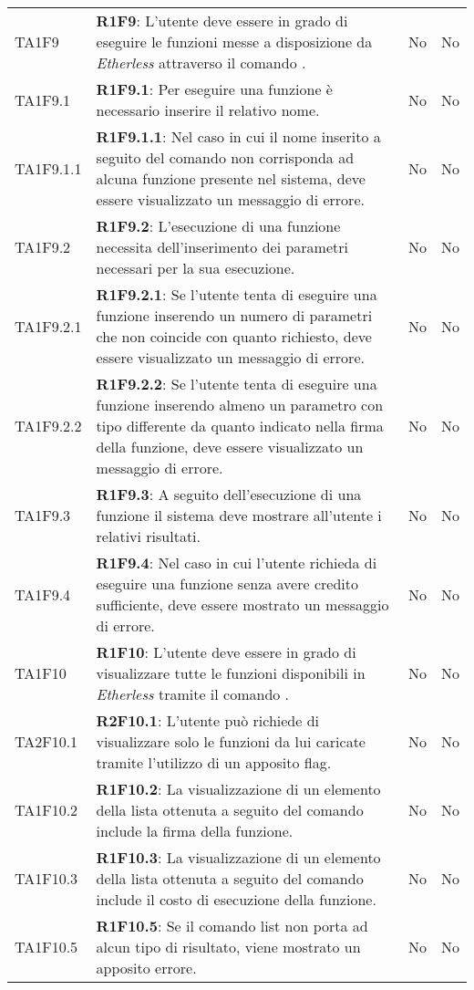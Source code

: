 \begin{longtable}{
		>{\centering}p{} 
		>{}p{}
		>{\centering}p{}
		>{\centering}p{} }
	TA1F9 		& \textbf{R1F9}: L'utente deve essere in grado di eseguire le funzioni messe a disposizione da \textit{Etherless} attraverso il comando \run{}.											& No & No \tabularnewline
	TA1F9.1 		& \textbf{R1F9.1}: Per eseguire una funzione è necessario inserire il relativo nome. 																										& No & No \tabularnewline
	TA1F9.1.1 	& \textbf{R1F9.1.1}: Nel caso in cui il nome inserito a seguito del comando \run{} non corrisponda ad alcuna funzione presente nel sistema, deve essere visualizzato un messaggio di errore. & No & No \tabularnewline
	TA1F9.2 		& \textbf{R1F9.2}: L'esecuzione di una funzione necessita dell'inserimento dei parametri necessari per la sua esecuzione.																	& No & No \tabularnewline
	TA1F9.2.1	& \textbf{R1F9.2.1}: Se l'utente tenta di eseguire una funzione inserendo un numero di parametri che non coincide con quanto richiesto, deve essere visualizzato un messaggio di errore. 	& No & No \tabularnewline
	TA1F9.2.2 	& \textbf{R1F9.2.2}: Se l'utente tenta di eseguire una funzione inserendo almeno un parametro con tipo differente da quanto indicato nella firma della funzione, deve essere visualizzato un messaggio di errore. & No & No \tabularnewline
	TA1F9.3 		& \textbf{R1F9.3}: A seguito dell'esecuzione di una funzione il sistema deve mostrare all'utente i relativi risultati. 																	& No & No \tabularnewline
	TA1F9.4 		& \textbf{R1F9.4}: Nel caso in cui l'utente richieda di eseguire una funzione senza avere credito sufficiente, deve essere mostrato un messaggio di errore.								& No & No \tabularnewline

	TA1F10 		& \textbf{R1F10}: L'utente deve essere in grado di visualizzare tutte le funzioni disponibili in \textit{Etherless} tramite il comando \lista{}. 										& No & No \tabularnewline
	TA2F10.1 	& \textbf{R2F10.1}: L'utente può richiede di visualizzare solo le funzioni da lui caricate tramite l'utilizzo di un apposito flag.															& No & No \tabularnewline
	TA1F10.2 	& \textbf{R1F10.2}: La visualizzazione di un elemento della lista ottenuta a seguito del comando \lista{} include la firma della funzione. 												& No & No \tabularnewline
	TA1F10.3 	& \textbf{R1F10.3}: La visualizzazione di un elemento della lista ottenuta a seguito del comando \lista{} include il costo di esecuzione della funzione. 									& No & No \tabularnewline
	TA1F10.5	& \textbf{R1F10.5}: Se il comando list non porta ad alcun tipo di risultato, viene mostrato un apposito errore. 																			& No & No \tabularnewline


\end{longtable}
